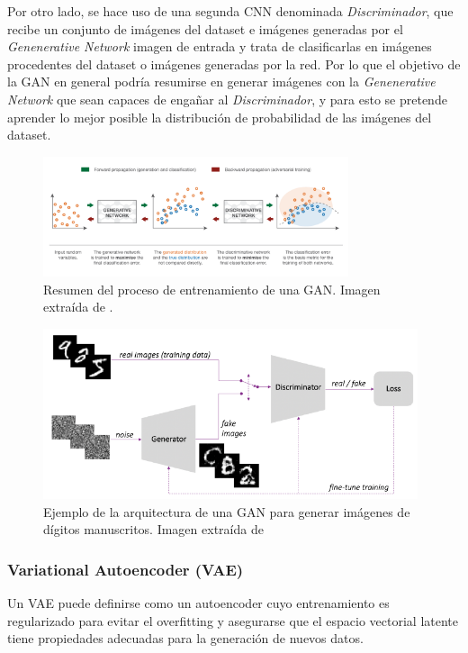             \medskip

            \noindent Por otro lado, se hace uso de una segunda CNN denominada \textit{Discriminador}, que recibe un conjunto de imágenes del dataset e imágenes generadas por el \textit{Genenerative Network} imagen de entrada y trata de clasificarlas en imágenes procedentes del dataset o imágenes generadas por la red. Por lo que el objetivo de la GAN en general podría resumirse en generar imágenes con la \textit{Genenerative Network} que sean capaces de engañar al \textit{Discriminador}, y para esto se pretende aprender lo mejor posible la distribución de probabilidad de las imágenes del dataset.

            \begin{figure}[!h]
                \centering
                \includegraphics[width=0.8\textwidth]{img/proceso_entrenamiento_GAN.png}
                \caption{Resumen del proceso de entrenamiento de una GAN. Imagen extraída de \cite{autoencoders2017}.}
            \end{figure}

            \begin{figure}[!h]
                \centering
                \includegraphics[width=0.98\textwidth]{img/GAN.png}
                \caption{Ejemplo de la arquitectura de una GAN para generar imágenes de dígitos manuscritos. Imagen extraída de \cite{AAE}}
                \label{fig:GAN}
            \end{figure}
 
        \subsubsection{Variational Autoencoder (VAE)}
            \noindent Un VAE puede definirse como un autoencoder cuyo entrenamiento es regularizado para evitar el overfitting y asegurarse que el espacio vectorial latente tiene propiedades adecuadas para la generación de nuevos datos.

